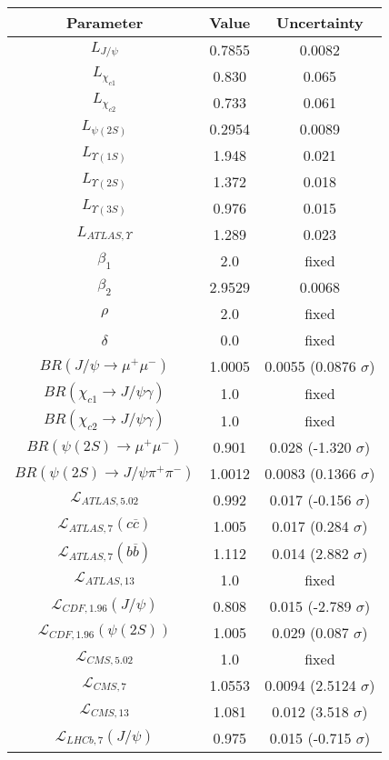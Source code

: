 \begin{table}[h!]
\centering
\begin{tabular}{c|c|c}
Parameter & Value & Uncertainty \\
\hline
$L_{J/\psi}$ & 0.7855 & 0.0082 \\
$L_{\chi_{c1}}$ & 0.830 & 0.065 \\
$L_{\chi_{c2}}$ & 0.733 & 0.061 \\
$L_{\psi(2S)}$ & 0.2954 & 0.0089 \\
$L_{\Upsilon(1S)}$ & 1.948 & 0.021 \\
$L_{\Upsilon(2S)}$ & 1.372 & 0.018 \\
$L_{\Upsilon(3S)}$ & 0.976 & 0.015 \\
$L_{ATLAS,\Upsilon}$ & 1.289 & 0.023 \\
$\beta_1$ & 2.0 & fixed \\
$\beta_2$ & 2.9529 & 0.0068 \\
$\rho$ & 2.0 & fixed \\
$\delta$ & 0.0 & fixed \\
$BR(J/\psi\rightarrow\mu^+\mu^-)$ & 1.0005 & 0.0055 (0.0876 $\sigma$) \\
$BR(\chi_{c1}\rightarrow J/\psi\gamma)$ & 1.0 & fixed \\
$BR(\chi_{c2}\rightarrow J/\psi\gamma)$ & 1.0 & fixed \\
$BR(\psi(2S)\rightarrow\mu^+\mu^-)$ & 0.901 & 0.028 (-1.320 $\sigma$) \\
$BR(\psi(2S)\rightarrow J/\psi\pi^+\pi^-)$ & 1.0012 & 0.0083 (0.1366 $\sigma$) \\
$\mathcal L_{ATLAS,5.02}$ & 0.992 & 0.017 (-0.156 $\sigma$) \\
$\mathcal L_{ATLAS,7}(c\overline c)$ & 1.005 & 0.017 (0.284 $\sigma$) \\
$\mathcal L_{ATLAS,7}(b\overline b)$ & 1.112 & 0.014 (2.882 $\sigma$) \\
$\mathcal L_{ATLAS,13}$ & 1.0 & fixed \\
$\mathcal L_{CDF,1.96}(J/\psi)$ & 0.808 & 0.015 (-2.789 $\sigma$) \\
$\mathcal L_{CDF,1.96}(\psi(2S))$ & 1.005 & 0.029 (0.087 $\sigma$) \\
$\mathcal L_{CMS,5.02}$ & 1.0 & fixed \\
$\mathcal L_{CMS,7}$ & 1.0553 & 0.0094 (2.5124 $\sigma$) \\
$\mathcal L_{CMS,13}$ & 1.081 & 0.012 (3.518 $\sigma$) \\
$\mathcal L_{LHCb,7}(J/\psi)$ & 0.975 & 0.015 (-0.715 $\sigma$) \\

\end{tabular}
\end{table}
